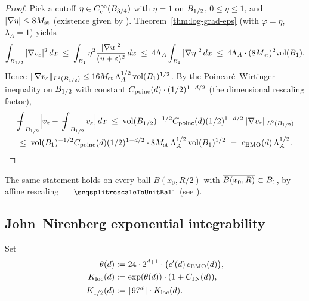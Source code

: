 \begin{proof}
\leanok
{}

Pick a cutoff $\eta \in C_c^\infty(B_{3/4})$ with $\eta = 1$ on $B_{1/2}$,
$0 \leq \eta \leq 1$, and $|\nabla \eta| \leq 8M_{\mathrm{st}}$ (existence given by
). Theorem~\ref{thm:log-grad-eps} (with
$\varphi = \eta$, $\lambda_A = 1$) yields
\begin{equation*}
  \int_{B_{1/2}} |\nabla v_\varepsilon|^2\,dx
    \;\leq\; \int_{B_{1}} \eta^2 \frac{|\nabla u|^2}{(u+\varepsilon)^2}\,dx
    \;\leq\; 4\Lambda_A \int_{B_{1}}|\nabla \eta|^2\,dx
    \;\leq\; 4\Lambda_A \cdot (8M_{\mathrm{st}})^2 \mathrm{vol}(B_{1}).
\end{equation*}
Hence $\|\nabla v_\varepsilon\|_{L^2(B_{1/2})} \leq 16M_{\mathrm{st}}\,\Lambda_A^{1/2}\,\mathrm{vol}(B_{1})^{1/2}$.
By the Poincar\'e--Wirtinger inequality on $B_{1/2}$ with constant
$C_{\mathrm{poinc}}(d) \cdot (1/2)^{1-d/2}$ (the dimensional rescaling factor),
\begin{multline*}
  \fint_{\Bz{1/2}}\Bigl|v_\varepsilon - \fint_{\Bz{1/2}} v_\varepsilon\Bigr|\,dx
    \;\leq\; \vol(\Bz{1/2})^{-1/2} \Cpoinc(d) (1/2)^{1-d/2}
        \|\nabla v_\varepsilon\|_{L^2(\Bz{1/2})} \\
    \;\leq\; \vol(\Bz 1)^{-1/2}\Cpoinc(d) (1/2)^{1-d/2}\cdot
        8\Mst\,\Lambda_A^{1/2}\,\vol(\Bz 1)^{1/2}
    \;=\; c_{\BMO}(d)\,\Lambda_A^{1/2}.
\end{multline*}
\end{proof}

The same statement holds on every ball $B(x_0, R/2)$ with $\overline{B(x_0,R)}
\subset B_{1}$, by affine rescaling $\leanname{rescaleToUnitBall}$
(see ).

\subsection{John--Nirenberg exponential integrability}

\begin{definition}
\label{def:JN-constants}
\leanok
{}
Set
\begin{align*}
  \theta(d)  &:= 24 \cdot 2^{d+1} \cdot \bigl(c'(d)\,c_{\mathrm{BMO}}(d)\bigr), \\
  K_{\mathrm{loc}}(d)&:= \exp(\theta(d)) \cdot (1 + C_{\mathrm{JN}}(d)),\\
  K_{1/2}(d) &:= \lceil 97^d \rceil \cdot K_{\mathrm{loc}}(d).
\end{align*}
\end{definition}

